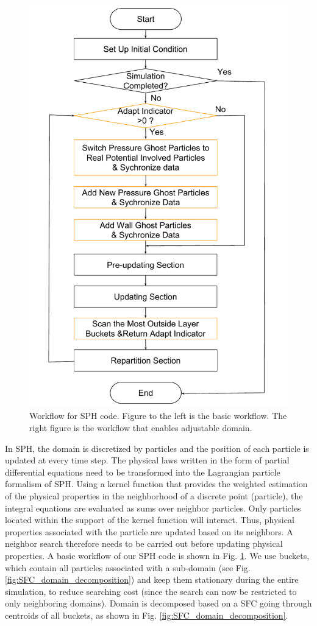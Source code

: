 \documentclass[procedia]{easychair}
\begin{document}
\begin{figure}[!t]
\includegraphics[scale=0.32]{Work_flow_adjust}
\caption{Workflow for SPH code. Figure to the left is the basic workflow. The right figure is the workflow that enables adjustable domain.}
\label{fig:Work_flow}
\end{figure}
In SPH, the domain is discretized by particles and the position of each particle is updated at every time step. The physical laws written in the form of partial differential equations need to be transformed into the Lagrangian particle formalism of SPH. Using a kernel function that provides the weighted estimation of the physical properties in the neighborhood of a discrete point (particle), the integral equations are evaluated as sums over neighbor particles. Only particles located within the support of the kernel function will interact. Thus, physical properties associated with the particle are updated based on its neighbors. A neighbor search therefore needs to be carried out before updating physical properties. A basic workflow of our SPH code is shown in Fig. \ref{fig:Work_flow}. We use buckets, which contain all particles associated with a sub-domain (see Fig. \ref{fig:SFC_domain_decomposition}) 
and keep them stationary during the entire simulation, to reduce searching cost (since the search can now be restricted to only neighboring domains).
Domain is decomposed based on a SFC going through centroids of all buckets, as shown in Fig. \ref{fig:SFC_domain_decomposition}.
\end{document}
